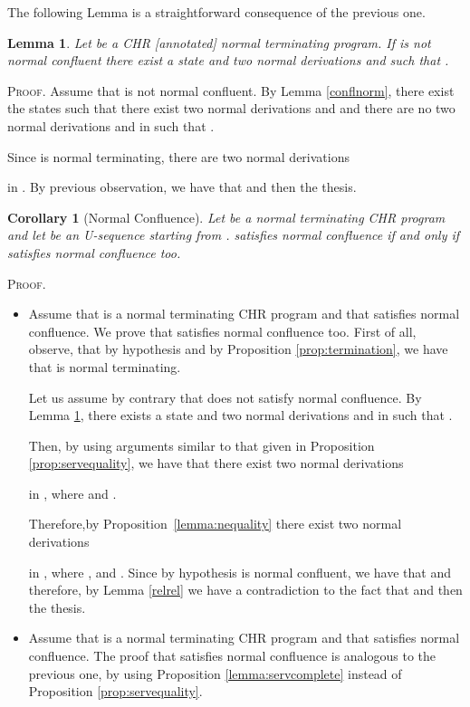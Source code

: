 \documentclass[final]{acmtrans2e}
\newtheorem{corollary}[theorem]{Corollary}
\newtheorem{lemma}[theorem]{Lemma}
\begin{document}
\noindent{}

The following Lemma is a straightforward consequence of the previous one.

\begin{lemma}\label{conflnormterm}
Let  be a CHR [annotated] normal terminating program. If  is not normal confluent there exist a state
 and two normal derivations  and  such that
.
\end{lemma}
\textsc{Proof.}
Assume that  is not normal confluent. By Lemma \ref{conflnorm},
there exist the states
 such that
there exist two normal derivations  and  and there are no two normal derivations  and  in  such that .


Since  is normal terminating, there are two normal derivations

in . By previous observation, we have that  and then the thesis.

\noindent{}



\begin{corollary}[Normal Confluence] Let  be a normal terminating CHR program and let 
be an U-sequence starting from .  satisfies normal confluence if and only if 
satisfies normal confluence too.
\end{corollary}
\textsc{Proof.}
\begin{itemize}
  \item Assume that  is a normal terminating CHR program and that  satisfies normal confluence. We prove that 
satisfies normal confluence too.
First of all, observe, that by hypothesis and by Proposition \ref{prop:termination}, we have that  is normal terminating.


Let us assume by contrary that  does not satisfy normal confluence.
By Lemma \ref{conflnormterm},  there exists a state  and two normal derivations  and  in  such that
.

Then, by using arguments similar to that given in Proposition \ref{prop:servequality}, we have that there exist two normal derivations

in , where
 and .

Therefore,by  Proposition~\ref{lemma:nequality}  there exist two normal derivations

in , where
,  and . Since  by hypothesis  is normal confluent, we have that  and therefore, by Lemma \ref{relrel} we have a contradiction to the fact that  and then the thesis.



  \item Assume that  is a normal terminating CHR program and that  satisfies normal confluence. The proof that 
satisfies normal confluence is analogous to the previous one, by using Proposition \ref{lemma:servcomplete} instead of Proposition \ref{prop:servequality}.
\end{itemize}
\end{document}
